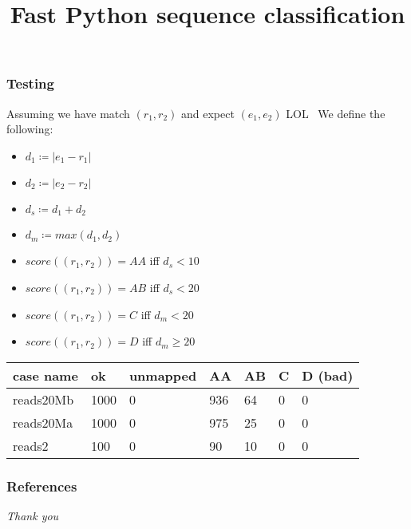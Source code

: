 \documentclass{beamer}
\title{Fast Python sequence classification}
\begin{document}
\frame{\titlepage}

\begin{frame}
  \frametitle{Testing}

  Assuming we have match $(r_1, r_2)$ and expect $(e_1, e_2)$
  LOL~\nocite{wombat2016}
  We define the following:

  \begin{itemize}
    \item $d_1 \coloneqq |e_1 - r_1|$
    \item $d_2 \coloneqq |e_2 - r_2|$
    \item $d_s \coloneqq d_1 + d_2$
    \item $d_m \coloneqq max(d_1, d_2)$
  \end{itemize}

  \begin{itemize}
    \item $score((r_1, r_2)) = AA$ iff $d_s < 10$
    \item $score((r_1, r_2)) = AB$ iff $d_s < 20$
    \item $score((r_1, r_2)) = C$ iff $d_m < 20$
    \item $score((r_1, r_2)) = D$ iff $d_m \geq 20$
  \end{itemize}

  
  \begin{table}[]
    \begin{tabular}{|l|l|l|l|l|l|l|}
    \hline
    case name                        & ok                          & unmapped                 & AA                         & AB                        & C                        & D (bad)                  \\ \hline
    \rowcolor[HTML]{333333} 
    {\color[HTML]{FFFFFF} reads20Mb} & {\color[HTML]{FFFFFF} 1000} & {\color[HTML]{FFFFFF} 0} & {\color[HTML]{FFFFFF} 936} & {\color[HTML]{FFFFFF} 64} & {\color[HTML]{FFFFFF} 0} & {\color[HTML]{FFFFFF} 0} \\ \hline
    \rowcolor[HTML]{FFFFFF} 
    {\color[HTML]{333333} reads20Ma} & {\color[HTML]{333333} 1000} & {\color[HTML]{333333} 0} & {\color[HTML]{333333} 975} & {\color[HTML]{333333} 25} & {\color[HTML]{333333} 0} & {\color[HTML]{333333} 0} \\ \hline
    \rowcolor[HTML]{333333} 
    {\color[HTML]{DAE8FC} reads2}    & {\color[HTML]{DAE8FC} 100}  & {\color[HTML]{DAE8FC} 0} & {\color[HTML]{DAE8FC} 90}  & {\color[HTML]{DAE8FC} 10} & {\color[HTML]{DAE8FC} 0} & {\color[HTML]{DAE8FC} 0} \\ \hline
    \end{tabular}
  
  \end{table}

\end{frame}

\begin{frame}
  \frametitle{References}
  \printbibliography
\end{frame}

\begin{frame}{}
  \centering \Large
  \emph{Thank you}
\end{frame}
\end{document}

